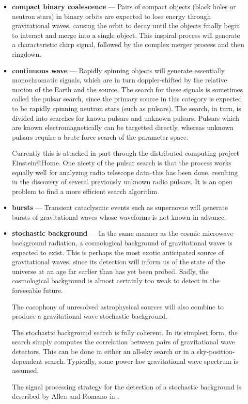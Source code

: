 \begin{itemize}

\item \textbf{compact binary coalescence} --- Pairs of compact objects
  (black holes or neutron stars) in binary orbits are expected to lose
  energy through gravitational waves, causing the orbit to decay until
  the objects finally begin to interact and merge into a single
  object.  This inspiral process will generate a characteristic chirp
  signal, followed by the complex merger process and then ringdown.

\item \textbf{continuous wave} --- Rapidly spinning objects will
  generate essentially monochromatic signals, which are in turn
  doppler-shifted by the relative motion of the Earth and the source.
  The search for these signals is sometimes called the pulsar search, since the primary source
  in this category is expected to be rapidly spinning neutron stars
  (such as pulsars).  The search, in turn, is divided into searches
  for known pulsars and unknown pulsars.  Pulsars which are known
  electromagnetically can be targetted directly, whereas unknown
  pulsars require a brute-force search of the parameter space.

  Currently this is attacked in part through the distributed computing
  project Einstein@Home.  One nicety of the pulsar search is that the
  process works equally well for analyzing radio telescope data--this
  has been done, resulting in the discovery of several previously
  unknown radio pulsars\cite{Knispel2010Pulsar}.  It is an open
  problem to find a more efficient search algorithm.

\item \textbf{bursts} --- Transient cataclysmic events such as
  supernovae will generate bursts of gravitational waves whose
  waveforms is not known in advance.  

\item \textbf{stochastic background} --- In the same manner as the
  cosmic microwave background radiation, a cosmological background of
  gravitational waves is expected to exist.  This is perhaps the most
  exotic anticipated source of gravitational waves, since its
  detection will inform us of the state of the universe at an age far
  earlier than has yet been probed.  Sadly, the cosmological
  background is almost certainly too weak to detect in the forseeable
  future.

  The cacophony of unresolved astrophysical sources will also combine
  to produce a gravitational wave stochastic background.   

  The stochastic background search is fully coherent.  In its simplest
  form, the search simply computes the correlation between pairs of
  gravitational wave detectors.  This can be done in either an all-sky
  search or in a sky-position-dependent search.  Typically, some
  power-law gravitational wave spectrum is assumed.
  
  The signal processing strategy for the detection of a stochastic background
  is described by Allen and Romano in \cite{Allen1999Detecting}.
\end{itemize}

